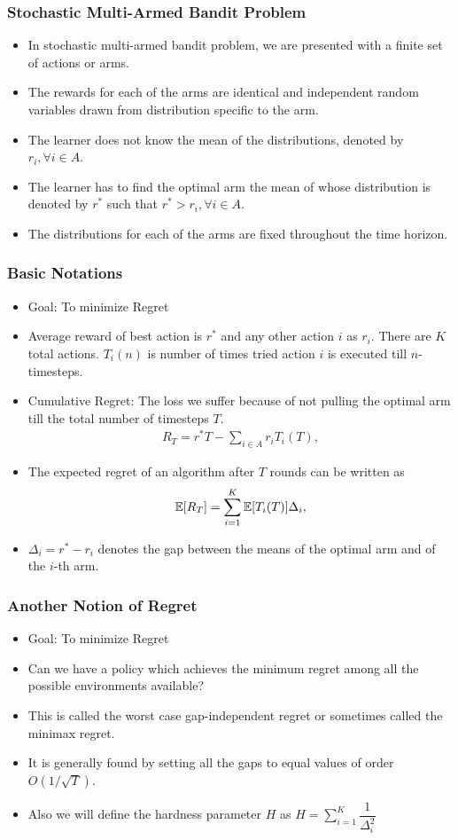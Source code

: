 \begin{frame}
\frametitle{Stochastic Multi-Armed Bandit Problem}
\begin{itemize}
\item<1-> In stochastic multi-armed bandit problem, we are presented with a finite set of actions or arms. 
\item<2-> The rewards for each of the arms are identical and independent random variables drawn from distribution specific to the arm.
\item<3-> The learner does not know the mean of the distributions, denoted by $r_{i},\forall i\in A$. 
\item<4-> The learner has to find the optimal arm the mean of whose distribution is denoted by $r^{*}$ such that $r^{*}> r_{i}, \forall i\in A$.
\item<5-> The distributions for each of the arms are fixed throughout the time horizon. 
\end{itemize}
\end{frame}

\begin{frame}
\frametitle{Basic Notations}
\begin{itemize}
\item<1-> Goal: To minimize Regret
\item<2-> Average reward of best action is $r^{*}$ and any other action $i$ as $r_{i}$. There are $K$ total actions. $T_{i}(n)$ is number of times tried action $i$ is executed till $n$-timesteps.
\item<3-> Cumulative Regret: The loss we suffer because of not pulling the optimal arm till the total number of timesteps  $T$. 
\begin{align*}
R_{T}=r^{*}T - \sum_{i\in A} r_{i}T_{i}(T),
\end{align*}
\item<4-> The expected regret of an algorithm after $T$ rounds can be written as
\begin{align*}
\mathbb{E}[R_{T}]= \sum_{i=1}^K \mathbb{E}[T_{i}(T)] \Delta_i,
\end{align*}
\item<4-> $\Delta_{i}=r^{*}-r_{i}$ denotes the gap between the means of the optimal arm and of the $i$-th arm. 
\end{itemize}
\end{frame}

\begin{frame}
\frametitle{Another Notion of Regret}
\begin{itemize}
\item<1-> Goal: To minimize Regret
\item<2-> Can we have a policy which achieves the minimum regret among all the possible environments available?
\item<3-> This is called the worst case gap-independent regret or sometimes called the minimax regret.
\item<4-> It is generally found by setting all the gaps to equal values of order $O\left( 1/\sqrt{T} \right)$.
\item<5-> Also we will define the hardness parameter $H$ as $H=\sum_{i=1}^{K}\dfrac{1}{\Delta_{i}^2}$
\end{itemize}
\end{frame}
